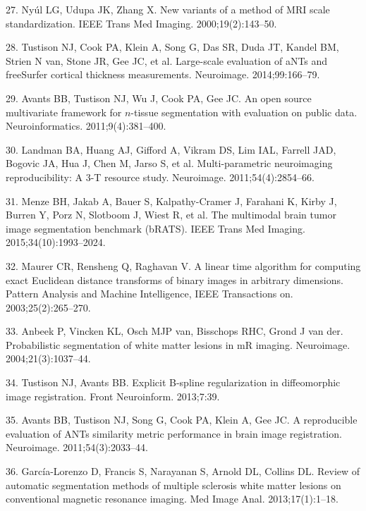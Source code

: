 \documentclass[11pt,]{article}
\begin{document}
\hypertarget{ref-nyul2000}{}
27. Nyúl LG, Udupa JK, Zhang X. New variants of a method of MRI scale
standardization. IEEE Trans Med Imaging. 2000;19(2):143--50.

\hypertarget{ref-Tustison:2014ab}{}
28. Tustison NJ, Cook PA, Klein A, Song G, Das SR, Duda JT, Kandel BM,
Strien N van, Stone JR, Gee JC, et al. Large-scale evaluation of aNTs
and freeSurfer cortical thickness measurements. Neuroimage.
2014;99:166--79.

\hypertarget{ref-Avants:2011aa}{}
29. Avants BB, Tustison NJ, Wu J, Cook PA, Gee JC. An open source
multivariate framework for \(n\)-tissue segmentation with evaluation on
public data. Neuroinformatics. 2011;9(4):381--400.

\hypertarget{ref-landman2011}{}
30. Landman BA, Huang AJ, Gifford A, Vikram DS, Lim IAL, Farrell JAD,
Bogovic JA, Hua J, Chen M, Jarso S, et al. Multi-parametric neuroimaging
reproducibility: A 3-T resource study. Neuroimage. 2011;54(4):2854--66.

\hypertarget{ref-Menze:2015aa}{}
31. Menze BH, Jakab A, Bauer S, Kalpathy-Cramer J, Farahani K, Kirby J,
Burren Y, Porz N, Slotboom J, Wiest R, et al. The multimodal brain tumor
image segmentation benchmark (bRATS). IEEE Trans Med Imaging.
2015;34(10):1993--2024.

\hypertarget{ref-maurer2003}{}
32. Maurer CR, Rensheng Q, Raghavan V. A linear time algorithm for
computing exact Euclidean distance transforms of binary images in
arbitrary dimensions. Pattern Analysis and Machine Intelligence, IEEE
Transactions on. 2003;25(2):265--270.

\hypertarget{ref-Anbeek:2004aa}{}
33. Anbeek P, Vincken KL, Osch MJP van, Bisschops RHC, Grond J van der.
Probabilistic segmentation of white matter lesions in mR imaging.
Neuroimage. 2004;21(3):1037--44.

\hypertarget{ref-Tustison:2013ac}{}
34. Tustison NJ, Avants BB. Explicit B-spline regularization in
diffeomorphic image registration. Front Neuroinform. 2013;7:39.

\hypertarget{ref-Avants:2011ab}{}
35. Avants BB, Tustison NJ, Song G, Cook PA, Klein A, Gee JC. A
reproducible evaluation of ANTs similarity metric performance in brain
image registration. Neuroimage. 2011;54(3):2033--44.

\hypertarget{ref-Garcia-Lorenzo:2013aa}{}
36. García-Lorenzo D, Francis S, Narayanan S, Arnold DL, Collins DL.
Review of automatic segmentation methods of multiple sclerosis white
matter lesions on conventional magnetic resonance imaging. Med Image
Anal. 2013;17(1):1--18.
\end{document}
